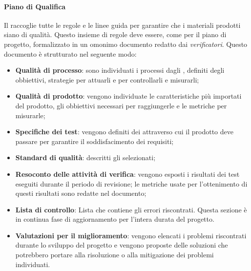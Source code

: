 \documentclass[../norme_di_progetto.tex]{subfiles}
\begin{document}
\paragraph{Piano di Qualifica}
Il \textsc{} raccoglie tutte le regole e le linee guida per garantire che i materiali prodotti siano di qualità. Questo insieme di regole deve essere, come per il piano di progetto, formalizzato in un omonimo documento redatto dai \emph{verificatori}.
Questo documento è strutturato nel seguente modo:
\begin{itemize}
    \item \textbf{Qualità di processo}: sono individuati i processi dagli , definiti degli obbiettivi, strategie per attuarli e  per controllarli e misurarli;
    \item \textbf{Qualità di prodotto}: vengono individuate le caratteristiche più importati del prodotto, gli obbiettivi necessari per raggiungerle e le metriche per misurarle;
    \item \textbf{Specifiche dei test}: vengono definiti dei  attraverso cui il prodotto deve passare per garantire il soddisfacimento dei requisiti;
    \item \textbf{Standard di qualità}: descritti gli  selezionati;
    \item \textbf{Resoconto delle attività di verifica}: vengono esposti i risultati dei test eseguiti durante il periodo di revisione; le metriche usate per l'ottenimento di questi risultati sono redatte nel documento;
	\item \textbf{Lista di controllo}:  Lista che contiene gli errori riscontrati. Questa sezione è in continua fase di aggiornamento per l'intera durata del progetto.
    \item \textbf{Valutazioni per il miglioramento}: vengono elencati i problemi riscontrati durante lo sviluppo del progetto e vengono proposte delle soluzioni che potrebbero portare alla risoluzione o alla mitigazione dei problemi individuati.
\end{itemize} 
\end{document}
